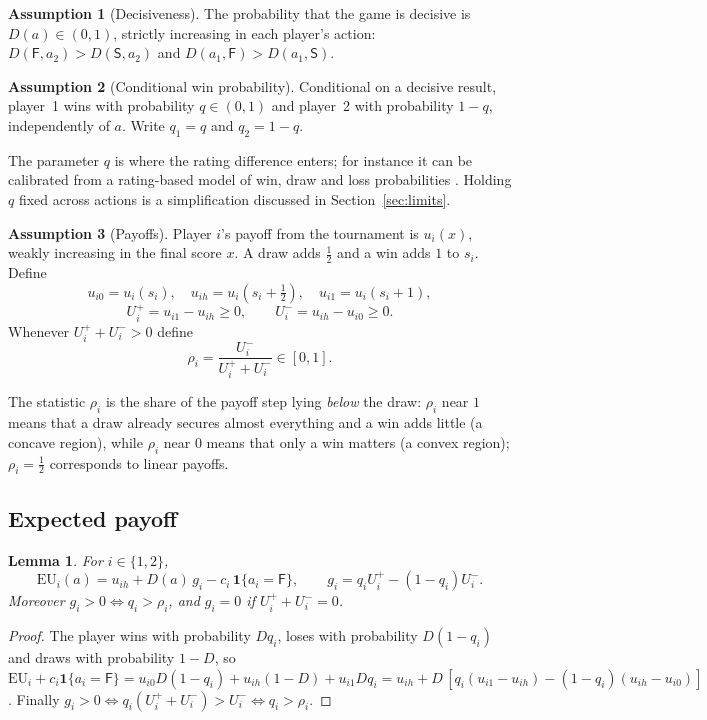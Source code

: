 \documentclass[11pt]{article}
\newtheorem{lemma}{Lemma}
\theoremstyle{definition}
\newtheorem{assumption}{Assumption}
\newcommand{\Sset}{\mathsf{S}}   %
\newcommand{\Fset}{\mathsf{F}}   %
\newcommand{\EU}{\mathrm{EU}}
\begin{document}
\begin{assumption}[Decisiveness]\label{as:D}
The probability that the game is decisive is $D(a)\in(0,1)$, strictly
increasing in each player's action: $D(\Fset,a_2)>D(\Sset,a_2)$ and
$D(a_1,\Fset)>D(a_1,\Sset)$.
\end{assumption}

\begin{assumption}[Conditional win probability]\label{as:q}
Conditional on a decisive result, player~1 wins with probability
$q\in(0,1)$ and player~2 with probability $1-q$, independently of $a$.
Write $q_1=q$ and $q_2=1-q$.
\end{assumption}

The parameter $q$ is where the rating difference enters; for instance it can
be calibrated from a rating-based model of win, draw and loss probabilities
\citep{elo,milvang}. Holding $q$ fixed across actions is a simplification
discussed in Section~\ref{sec:limits}.

\begin{assumption}[Payoffs]\label{as:u}
Player $i$'s payoff from the tournament is $u_i(x)$, weakly increasing in the
final score $x$. A draw adds $\tfrac12$ and a win adds $1$ to $s_i$. Define
\[
u_{i0}=u_i(s_i),\quad u_{ih}=u_i(s_i+\tfrac12),\quad u_{i1}=u_i(s_i+1),
\]
\[
U_i^{+}=u_{i1}-u_{ih}\ge 0,\qquad U_i^{-}=u_{ih}-u_{i0}\ge 0 .
\]
Whenever $U_i^{+}+U_i^{-}>0$ define
\[
\rho_i=\frac{U_i^{-}}{U_i^{+}+U_i^{-}}\in[0,1].
\]
\end{assumption}

The statistic $\rho_i$ is the share of the payoff step lying
\emph{below} the draw: $\rho_i$ near $1$ means that a draw already secures
almost everything and a win adds little (a concave region), while $\rho_i$
near $0$ means that only a win matters (a convex region); $\rho_i=\tfrac12$
corresponds to linear payoffs.

\subsection{Expected payoff}

\begin{lemma}\label{lem:EU}
For $i\in\{1,2\}$,
\[
\EU_i(a)=u_{ih}+D(a)\,g_i-c_i\,\mathbf 1\{a_i=\Fset\},
\qquad g_i=q_iU_i^{+}-(1-q_i)U_i^{-}.
\]
Moreover $g_i>0\iff q_i>\rho_i$, and $g_i=0$ if $U_i^{+}+U_i^{-}=0$.
\end{lemma}

\begin{proof}
The player wins with probability $D q_i$, loses with probability
$D(1-q_i)$ and draws with probability $1-D$, so
$\EU_i+c_i\mathbf 1\{a_i=\Fset\}=u_{i0}D(1-q_i)+u_{ih}(1-D)+u_{i1}Dq_i
=u_{ih}+D\,[q_i(u_{i1}-u_{ih})-(1-q_i)(u_{ih}-u_{i0})]$.
Finally $g_i>0\iff q_i(U_i^{+}+U_i^{-})>U_i^{-}\iff q_i>\rho_i$.
\end{proof}
\end{document}
